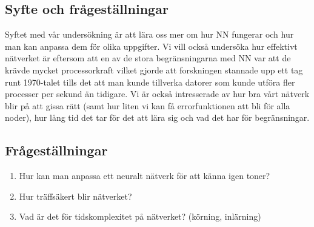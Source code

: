 \documentclass[a4paper,10pt]{article}
\begin{document}





\subsection{Syfte och frågeställningar}

Syftet med vår undersökning är att lära oss mer om hur NN fungerar och hur man kan anpassa dem för olika uppgifter. Vi vill också undersöka hur effektivt nätverket är eftersom att en av de stora begränsningarna med NN var att de krävde mycket processorkraft vilket gjorde att forskningen stannade upp ett tag runt 1970-talet tills det att man kunde tillverka datorer som kunde utföra fler processer per sekund än tidigare. Vi är också intresserade av hur bra vårt nätverk blir på att gissa rätt (samt hur liten vi kan få errorfunktionen att bli för alla noder), hur lång tid det tar för det att lära sig och vad det har för begränsningar.

\subsection{Frågeställningar}
\begin{enumerate}
\item Hur kan man anpassa ett neuralt nätverk för att känna igen toner?
\item Hur träffsäkert blir nätverket?
\item Vad är det för tidskomplexitet på nätverket? (körning, inlärning)
\end{enumerate}
\end{document}
